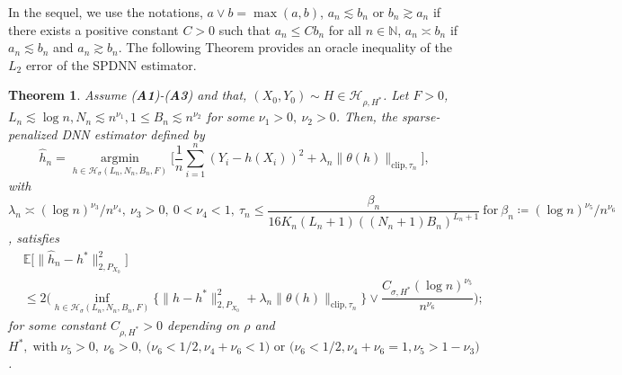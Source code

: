 \documentclass[10pt,twoside]{article}
\numberwithin{equation}{section}
\newtheorem{thm}{Theorem}[section]
\newcommand{\E}{\ensuremath{\mathbb{E}}}
\newcommand{\N}{\ensuremath{\mathbb{N}}}
\DeclareMathOperator*{\argmin}{argmin}
\begin{document}
\medskip

In the sequel, we use the notations, $a \lor b = \max(a,b)$, 
%
$ a_n \lesssim b_n$ or  $ b_n \gtrsim  a_n$  if there exists a positive constant $C> 0$ such that $ a_n \leq  C b_n$ for all $ n \in \N$, $a_n \asymp b_n$ if $ a_n \lesssim b_n$ and $ a_n \gtrsim b_n$.
%
The following Theorem provides an oracle inequality of the $ L_2$ error of the SPDNN estimator.
%

\begin{thm}\label{thm1}
Assume (\textbf{A1})-(\textbf{A3}) and that, $(X_0, Y_0) \sim H \in \mathcal{H}_{\rho, H^ {*}} $. Let  $F > 0$,
  $L_n \lesssim \log n, N_n \lesssim n^{\nu_1},  1 \leq  B_n \lesssim n^{\nu_2} $ for some $\nu_1 >0, ~ \nu_2 > 0$. Then, the sparse-penalized DNN estimator defined by 
%
\begin{equation}\label{EMR_algo}
\widehat{h}_n = \underset{h\in \mathcal{H}_{\sigma}(L_n, N_n, B_n, F)}{\argmin}\Big[\dfrac{1}{n} \sum_{i=1} ^{n} \left(Y_i - h(X_i)\right) ^{2} + \lambda_n \|\theta (h) \|_{ \text{clip}, \tau_n} \Big],  
\end{equation}
%
with $ \lambda_n \asymp (\log n) ^{\nu_3} /n^{\nu_4}, ~ \nu_3 > 0, ~  0< \nu_4 < 1, ~ \tau_n \leq  
  \dfrac{\beta_n}{16 K_n  (L_n + 1)((N_n + 1) B_n)^{L_n +1}} ~ \text{for} ~ \beta_n \coloneqq (\log n)^{\nu_5} /n^{\nu_6} $, satisfies
%
\begin{align}\label{bound_error}
\nonumber & \E\Big[ \| \widehat{h}_n - h^ {*} \|_{2, P_ {X_0}} ^2 \Big]  
\\
& \leq 2\Bigg( \underset{h \in \mathcal{H}_{\sigma}(L_n, N_n, B_n,  F)}{\inf} \{ \| h - h^ {*} \|_{2, P_ {X_0}}^2 + \lambda_n \|\theta (h)\|_ { \text{clip}, \tau_n} \} \lor  \dfrac{C_{ \sigma, H^ {*}} (\log n)^{\nu_5}}{n^{\nu_6}}  \Bigg);
\end{align}
%
for some constant $C_ { \rho, H^ {*}} > 0$ depending on  $\rho$ and $H^ {*}, \; \text{with} \;  
  \nu_5 >0, ~ \nu_6 >0, ~ \Big( \nu_6 < 1/2, \nu_4 + \nu_6 <1  \Big) \text{ or } \Big( \nu_6 < 1/2, \nu_4 + \nu_6 =1, \nu_5 > 1-\nu_3 \Big)$.
\end{thm}

\medskip
\end{document}
